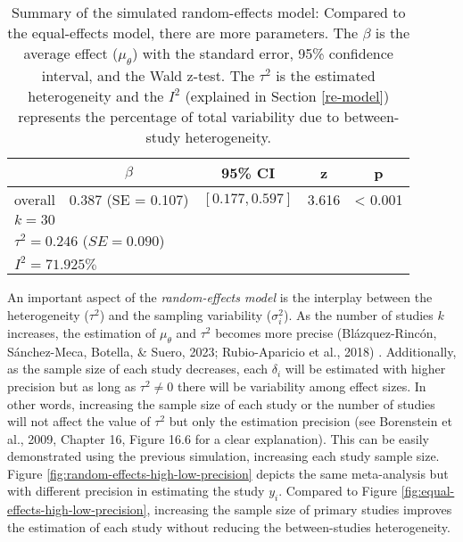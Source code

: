 \documentclass[
  man,floatsintext]{apa6}
\begin{document}
\scriptsize

\begin{table}[H]

\caption{\label{tab:res-random-effects}Summary of the simulated random-effects model: Compared to the equal-effects model, there are more parameters. The \(\beta\) is the average effect (\(\mu_{\theta}\)) with the standard error, 95\% confidence interval, and the Wald z-test. The \(\tau^{2}\) is the estimated heterogeneity and the \(I^{2}\) (explained in Section \ref{re-model}) represents the percentage of total variability due to between-study heterogeneity.}
\centering
\fontsize{9}{11}\selectfont
\begin{tabular}[t]{ccccc}
\toprule
 & $\beta$ & 95\% CI & z & p\\
\midrule
overall & 0.387 (SE = 0.107) & $[0.177, 0.597]$ & 3.616 & < 0.001\\
\bottomrule
\multicolumn{5}{l}{\textsuperscript{} $k = 30$}\\
\multicolumn{5}{l}{\textsuperscript{} $\tau^2 = 0.246$ ($SE = 0.090$)}\\
\multicolumn{5}{l}{\textsuperscript{} $I^2 = 71.925\%$}\\
\end{tabular}
\end{table}

\normalsize

An important aspect of the \emph{random-effects model} is the interplay between the heterogeneity (\(\tau^{2}\)) and the sampling variability (\(\sigma_{i}^{2}\)). As the number of studies \(k\) increases, the estimation of \(\mu_{\theta}\) and \(\tau^{2}\) becomes more precise (Blázquez-Rincón, Sánchez-Meca, Botella, \& Suero, 2023; Rubio-Aparicio et al., 2018) . Additionally, as the sample size of each study decreases, each \(\delta_{i}\) will be estimated with higher precision but as long as \(\tau^{2} \neq 0\) there will be variability among effect sizes. In other words, increasing the sample size of each study or the number of studies will not affect the value of \(\tau^{2}\) but only the estimation precision (see Borenstein et al., 2009, Chapter 16, Figure 16.6 for a clear explanation). This can be easily demonstrated using the previous simulation, increasing each study sample size. Figure \ref{fig:random-effects-high-low-precision} depicts the same meta-analysis but with different precision in estimating the study \(y_{i}\). Compared to Figure \ref{fig:equal-effects-high-low-precision}, increasing the sample size of primary studies improves the estimation of each study without reducing the between-studies heterogeneity.
\end{document}
